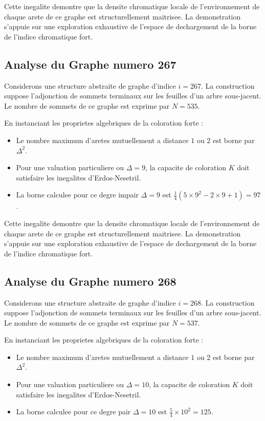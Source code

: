 \documentclass[11pt,a4paper]{article}
\begin{document}
Cette inegalite demontre que la densite chromatique locale de l'environnement de chaque arete de ce graphe est structurellement maitrisee. La demonstration s'appuie sur une exploration exhaustive de l'espace de dechargement de la borne de l'indice chromatique fort.

\subsection{Analyse du Graphe numero 267}
Considerons une structure abstraite de graphe d'indice $i = 267$. La construction suppose l'adjonction de sommets terminaux sur les feuilles d'un arbre sous-jacent. Le nombre de sommets de ce graphe est exprime par $N = 535$.

En instanciant les proprietes algebriques de la coloration forte :
\begin{itemize}
\item Le nombre maximum d'aretes mutuellement a distance $1$ ou $2$ est borne par $\Delta^2$.
\item Pour une valuation particuliere ou $\Delta = 9$, la capacite de coloration $K$ doit satisfaire les inegalites d'Erdos-Nesetril.
\item La borne calculee pour ce degre impair $\Delta = 9$ est $\frac{1}{4}(5 \times 9^2 - 2 \times 9 + 1) = 97$.
\end{itemize}

Cette inegalite demontre que la densite chromatique locale de l'environnement de chaque arete de ce graphe est structurellement maitrisee. La demonstration s'appuie sur une exploration exhaustive de l'espace de dechargement de la borne de l'indice chromatique fort.

\subsection{Analyse du Graphe numero 268}
Considerons une structure abstraite de graphe d'indice $i = 268$. La construction suppose l'adjonction de sommets terminaux sur les feuilles d'un arbre sous-jacent. Le nombre de sommets de ce graphe est exprime par $N = 537$.

En instanciant les proprietes algebriques de la coloration forte :
\begin{itemize}
\item Le nombre maximum d'aretes mutuellement a distance $1$ ou $2$ est borne par $\Delta^2$.
\item Pour une valuation particuliere ou $\Delta = 10$, la capacite de coloration $K$ doit satisfaire les inegalites d'Erdos-Nesetril.
\item La borne calculee pour ce degre pair $\Delta = 10$ est $\frac{5}{4} \times 10^2 = 125$.
\end{itemize}
\end{document}
